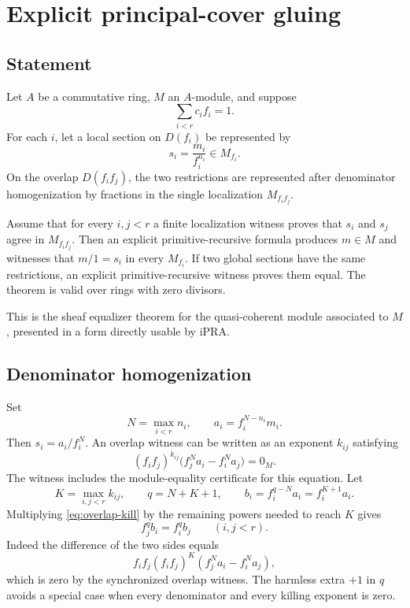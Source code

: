 \section{Explicit principal-cover gluing}

\subsection{Statement}

Let $A$ be a commutative ring, $M$ an $A$-module, and suppose
\[
                  \sum_{i<r}c_i f_i=1.
\]
For each $i$, let a local section on $D(f_i)$ be represented by
\[
                  s_i=\frac{m_i}{f_i^{n_i}}\in M_{f_i}.
\]
On the overlap $D(f_if_j)$, the two restrictions are represented after denominator
homogenization by fractions in the single localization $M_{f_if_j}$.

\begin{theorem}\label{thm:principal-gluing}
Assume that for every $i,j<r$ a finite localization witness proves that $s_i$ and $s_j$ agree in
$M_{f_if_j}$.  Then an explicit primitive-recursive formula produces $m\in M$ and witnesses that
$m/1=s_i$ in every $M_{f_i}$.  If two global sections have the same restrictions, an explicit
primitive-recursive witness proves them equal.  The theorem is valid over rings with zero divisors.
\end{theorem}

This is the sheaf equalizer theorem for the quasi-coherent module associated to $M$, presented in a
form directly usable by iPRA.

\subsection{Denominator homogenization}

Set
\[
                         N=\max_{i<r} n_i,
          \qquad a_i=f_i^{N-n_i}m_i.
\]
Then $s_i=a_i/f_i^N$.  An overlap witness can be written as an exponent $k_{ij}$ satisfying
\begin{equation}\label{eq:overlap-kill}
  (f_if_j)^{k_{ij}}
  \bigl(f_j^N a_i-f_i^N a_j\bigr)=0_M.
\end{equation}
The witness includes the module-equality certificate for this equation.  Let
\[
                         K=\max_{i,j<r}k_{ij},
             \qquad q=N+K+1,
             \qquad b_i=f_i^{q-N}a_i=f_i^{K+1}a_i.
\]
Multiplying \eqref{eq:overlap-kill} by the remaining powers needed to reach $K$ gives
\begin{equation}\label{eq:cross-common}
                         f_j^q b_i=f_i^q b_j
                         \qquad(i,j<r).
\end{equation}
Indeed the difference of the two sides equals
\[
 f_if_j(f_if_j)^K(f_j^Na_i-f_i^Na_j),
\]
which is zero by the synchronized overlap witness.  The harmless extra $+1$ in $q$ avoids a special
case when every denominator and every killing exponent is zero.

